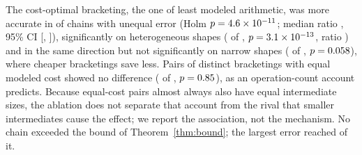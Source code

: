 \documentclass[acmsmall,review,anonymous,nonacm]{acmart}
\begin{document}
The cost-optimal bracketing, the one of least modeled arithmetic, was more
accurate in \RqSixPooledBetter{} of \RqSixPooledUnequal{} chains with unequal
error (Holm $p=4.6\times10^{-11}$; median ratio \RqSixPooledRatio{}, 95\% CI
[\RqSixPooledRatioLo, \RqSixPooledRatioHi]), significantly on heterogeneous
shapes (\RqSixHeterogeneousBetter{} of \RqSixHeterogeneousUnequal,
$p=3.1\times10^{-13}$, ratio \RqSixHeterogeneousRatio) and in the same
direction but not significantly on narrow shapes (\RqSixNarrowBetter{} of
\RqSixNarrowUnequal, $p=0.058$), where cheaper bracketings save less.
Pairs of distinct bracketings with equal modeled cost showed no difference
(\RqSixAblPooledFirst{} of \RqSixAblPooledUnequal, $p=0.85$), as an
operation-count account predicts. Because equal-cost pairs almost always also
have equal intermediate sizes, the ablation does not separate that account from
the rival that smaller intermediates cause the effect; we report the association,
not the mechanism. No chain exceeded the bound of Theorem~\ref{thm:bound}; the
largest error reached \RqSixMaxOverBound{} of it.
\end{document}
